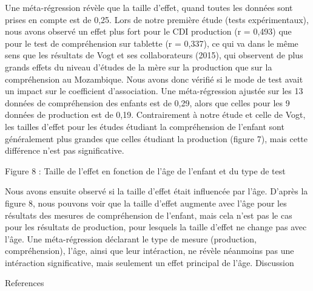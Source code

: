 \documentclass[english,man]{apa6}
\theoremstyle{definition}
\theoremstyle{definition}
\theoremstyle{definition}
\theoremstyle{remark}
\begin{document}
Une méta-régression révèle que la taille d'effet, quand toutes les
données sont prises en compte est de 0,25. Lors de notre première étude
(tests expérimentaux), nous avons observé un effet plus fort pour le CDI
production (r = 0,493) que pour le test de compréhension sur tablette (r
= 0,337), ce qui va dans le même sens que les résultats de Vogt et ses
collaborateurs (2015), qui observent de plus grands effets du niveau
d'études de la mère sur la production que sur la compréhension au
Mozambique. Nous avons donc vérifié si le mode de test avait un impact
sur le coefficient d'association. Une méta-régression ajustée sur les 13
données de compréhension des enfants est de 0,29, alors que celles pour
les 9 données de production est de 0,19. Contrairement à notre étude et
celle de Vogt, les tailles d'effet pour les études étudiant la
compréhension de l'enfant sont généralement plus grandes que celles
étudiant la production (figure 7), mais cette différence n'est pas
significative.

Figure 8 : Taille de l'effet en fonction de l'âge de l'enfant et du type
de test

Nous avons ensuite observé si la taille d'effet était influencée par
l'âge. D'après la figure 8, nous pouvons voir que la taille d'effet
augmente avec l'âge pour les résultats des mesures de compréhension de
l'enfant, mais cela n'est pas le cas pour les résultats de production,
pour lesquels la taille d'effet ne change pas avec l'âge. Une
méta-régression déclarant le type de mesure (production, compréhension),
l'âge, ainsi que leur intéraction, ne révèle néanmoins pas une
intéraction significative, mais seulement un effet principal de l'âge.
Discussion

References
\end{document}

